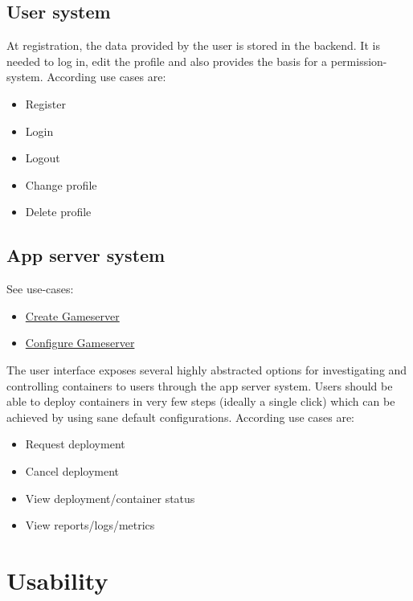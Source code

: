\documentclass[a4paper,12pt,chapterprefix=false,bibliography=totoc,listof=totoc,]{scrreprt}
\begin{document}
\subsection{{\color{magenta} User system}}
{\color{magenta}
At registration, the data provided by the user is stored in the backend. It is needed to log in, edit the profile and also provides the basis for a permission-system. According use cases are:

\begin{itemize}
    \item Register
    \item Login
    \item Logout
    \item Change profile
    \item Delete profile
\end{itemize}
}

\subsection{{\color{magenta} App server system}}
See use-cases:
\begin{itemize}
    \item \href{https://gamebase.pages.gitlab.tandashi.de/documentation/UCCreateGameServer.pdf}{Create Gameserver}
    \item \href{https://gamebase.pages.gitlab.tandashi.de/documentation/UCConfigureGameServer.pdf}{Configure Gameserver}
\end{itemize}
{\color{magenta}
The user interface exposes several highly abstracted options for investigating and controlling containers to users through the app server system. Users should be able to deploy containers in very few steps (ideally a single click) which can be achieved by using sane default configurations. According use cases are:

\begin{itemize}
    \item Request deployment
    \item Cancel deployment
    \item View deployment/container status
    \item View reports/logs/metrics
\end{itemize}
}

\section{{\color{magenta} Usability}}
\end{document}
